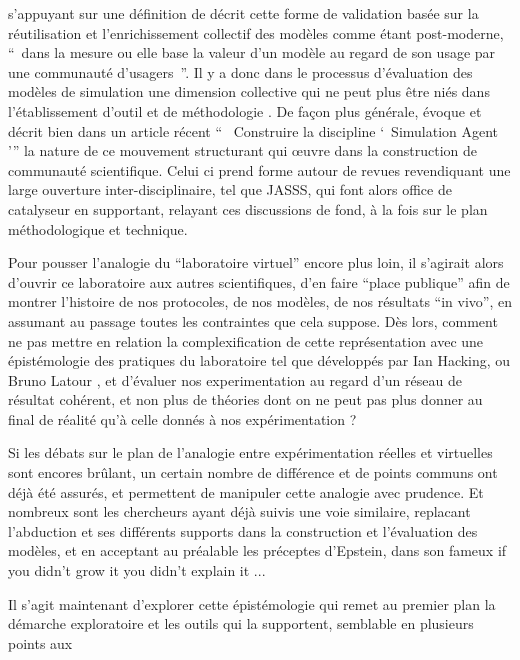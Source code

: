 \autocite{Rouchier2013} s'appuyant sur une définition de  décrit cette forme de validation basée sur la réutilisation et l'enrichissement collectif des modèles comme étant post-moderne, \enquote{ dans la mesure ou elle base la valeur d'un modèle au regard de son usage par une communauté d'usagers }. Il y a donc dans le processus d'évaluation des modèles de simulation une dimension collective qui ne peut plus être niés dans l'établissement d'outil et de méthodologie . De façon plus générale, \autocite{Rouchier2013} évoque et décrit bien dans un article récent \enquote{  Construire la discipline \enquote{ Simulation Agent }} la nature de ce mouvement structurant qui œuvre dans la construction de communauté scientifique. Celui ci prend forme autour de revues revendiquant une large ouverture inter-disciplinaire, tel que JASSS, qui font alors office de catalyseur en supportant, relayant ces discussions de fond, à la fois sur le plan méthodologique et technique.

Pour pousser l'analogie du \enquote{laboratoire virtuel} encore plus loin, il s'agirait alors d'ouvrir ce laboratoire aux autres scientifiques, d'en faire \enquote{place publique} afin de montrer l'histoire de nos protocoles, de nos modèles, de nos résultats \foreignquote{latin}{in vivo}, en assumant au passage toutes les contraintes que cela suppose. Dès lors, comment ne pas mettre en relation la complexification de cette représentation avec une épistémologie des pratiques du laboratoire tel que développés par Ian Hacking, ou Bruno Latour , et d'évaluer nos experimentation au regard d'un réseau de résultat cohérent, et non plus de théories dont on ne peut pas plus donner au final de réalité qu'à celle donnés à nos expérimentation ? 

Si les débats sur le plan de l'analogie entre expérimentation réelles et virtuelles sont encores brûlant, un certain nombre de différence et de points communs ont déjà été assurés, et permettent de manipuler cette analogie avec prudence. Et nombreux sont les chercheurs ayant déjà suivis une voie similaire, replacant l'abduction et ses différents supports dans la construction et l'évaluation des modèles, et en acceptant au préalable les préceptes d'Epstein, dans son fameux if you didn't grow it you didn't explain it ... %

Il s'agit maintenant d'explorer cette épistémologie qui remet au premier plan la démarche exploratoire et les outils qui la supportent, semblable en plusieurs points aux 

